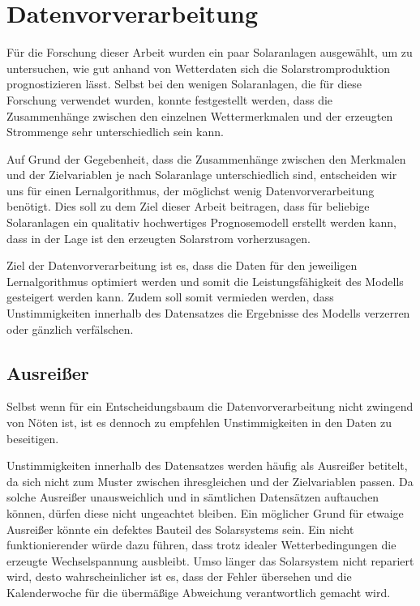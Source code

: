 \documentclass[12pt, a4paper]{article}
\begin{document}
\section{Datenvorverarbeitung}
\label{sec:data_preparation}

Für die Forschung dieser Arbeit wurden ein paar Solaranlagen ausgewählt, um zu untersuchen, wie gut anhand von Wetterdaten sich die Solarstromproduktion prognostizieren lässt. Selbst bei den wenigen Solaranlagen, die für diese Forschung verwendet wurden, konnte festgestellt werden, dass die Zusammenhänge zwischen den einzelnen Wettermerkmalen und der erzeugten Strommenge sehr unterschiedlich sein kann.

Auf Grund der Gegebenheit, dass die Zusammenhänge zwischen den Merkmalen und der Zielvariablen je nach Solaranlage unterschiedlich sind, entscheiden wir uns für einen Lernalgorithmus, der möglichst wenig Datenvorverarbeitung benötigt. Dies soll zu dem Ziel dieser Arbeit beitragen, dass für beliebige Solaranlagen ein qualitativ hochwertiges Prognosemodell erstellt werden kann, dass in der Lage ist den erzeugten Solarstrom vorherzusagen.

Ziel der Datenvorverarbeitung ist es, dass die Daten für den jeweiligen Lernalgorithmus optimiert werden und somit die Leistungsfähigkeit des Modells gesteigert werden kann. Zudem soll somit vermieden werden, dass Unstimmigkeiten innerhalb des Datensatzes die Ergebnisse des Modells verzerren oder gänzlich verfälschen.

\subsection{Ausreißer}

Selbst wenn für ein Entscheidungsbaum die Datenvorverarbeitung nicht zwingend von Nöten ist, ist es dennoch zu empfehlen Unstimmigkeiten in den Daten zu beseitigen.

Unstimmigkeiten innerhalb des Datensatzes werden häufig als Ausreißer betitelt, da sich nicht zum Muster zwischen ihresgleichen und der Zielvariablen passen. Da solche Ausreißer unausweichlich und in sämtlichen Datensätzen auftauchen können, dürfen diese nicht ungeachtet bleiben. Ein möglicher Grund für etwaige Ausreißer könnte ein defektes Bauteil des Solarsystems sein. Ein nicht funktionierender würde dazu führen, dass trotz idealer Wetterbedingungen die erzeugte Wechselspannung ausbleibt. Umso länger das Solarsystem nicht repariert wird, desto wahrscheinlicher ist es, dass der Fehler übersehen und die Kalenderwoche für die übermäßige Abweichung verantwortlich gemacht wird.
\end{document}

